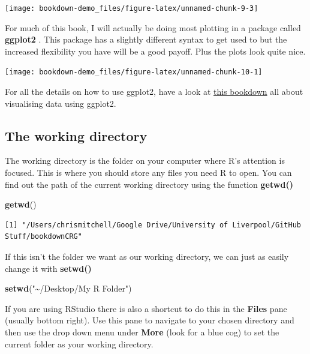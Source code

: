 \documentclass[
]{book}
\newenvironment{Shaded}{\begin{snugshade}}{\end{snugshade}}
\newcommand{\KeywordTok}[1]{\textcolor[rgb]{0.13,0.29,0.53}{\textbf{#1}}}
\newcommand{\NormalTok}[1]{#1}
\newcommand{\StringTok}[1]{\textcolor[rgb]{0.31,0.60,0.02}{#1}}
\begin{document}
\begin{center}\texttt{[image: bookdown-demo\_files/figure-latex/unnamed-chunk-9-3]} \end{center}

For much of this book, I will actually be doing most plotting in a package called \textbf{ggplot2} \citep{ggplot2}. This package has a slightly different syntax to get used to but the increased flexibility you have will be a good payoff. Plus the plots look quite nice.

\begin{center}\texttt{[image: bookdown-demo\_files/figure-latex/unnamed-chunk-10-1]} \end{center}

For all the details on how to use ggplot2, have a look at \href{https://ggplot2.tidyverse.org}{this bookdown} all about visualising data using ggplot2.

\hypertarget{the-working-directory}{%
\subsection{The working directory}\label{the-working-directory}}

The working directory is the folder on your computer where R's attention is focused. This is where you should store any files you need R to open. You can find out the path of the current working directory using the function \textbf{getwd()}

\begin{Shaded}
\begin{Highlighting}[]
\KeywordTok{getwd}\NormalTok{()}
\end{Highlighting}
\end{Shaded}

\begin{verbatim}
[1] "/Users/chrismitchell/Google Drive/University of Liverpool/GitHub Stuff/bookdownCRG"
\end{verbatim}

If this isn't the folder we want as our working directory, we can just as easily change it with \textbf{setwd()}

\begin{Shaded}
\begin{Highlighting}[]
\KeywordTok{setwd}\NormalTok{(}\StringTok{"\textasciitilde{}/Desktop/My R Folder"}\NormalTok{)}
\end{Highlighting}
\end{Shaded}

If you are using RStudio there is also a shortcut to do this in the \textbf{Files} pane (usually bottom right). Use this pane to navigate to your chosen directory and then use the drop down menu under \textbf{More} (look for a blue cog) to set the current folder as your working directory.
\end{document}
